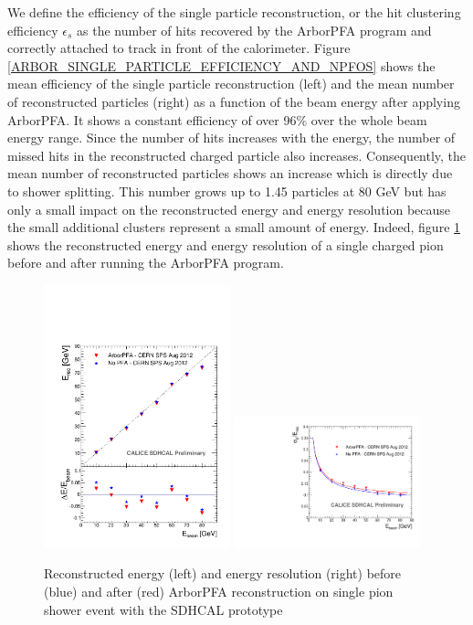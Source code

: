 \documentclass[cits]{JINST}
\begin{document}
We define the efficiency of the single particle reconstruction, or the hit clustering efficiency $\epsilon_s$ as the number of hits recovered by the ArborPFA program and correctly attached to track in front of the calorimeter. Figure \ref{ARBOR_SINGLE_PARTICLE_EFFICIENCY_AND_NPFOS} shows the mean efficiency of the single particle reconstruction (left) and the mean number of reconstructed particles (right) as a function of the beam energy after applying ArborPFA. It shows a constant efficiency of over 96\% over the whole beam energy range. Since the number of hits increases with the energy, the number of missed hits in the reconstructed charged particle also increases. Consequently, the mean number of reconstructed particles shows an increase which is directly due to shower splitting. This number grows up to 1.45 particles at 80 GeV but has only a small impact on the reconstructed energy and energy resolution because the small additional clusters represent a small amount of energy. Indeed, figure \ref{ARBOR_SINGLE_PARTICLE_EREC_AND_ERESOL} shows the reconstructed energy and energy resolution of a single charged pion before and after running the ArborPFA program. 

\begin{figure}[!h]
  \begin{center}
    \includegraphics[width=0.48\textwidth]{plots/SingleParticle_ERec.pdf}
    \includegraphics[width=0.48\textwidth]{plots/SingleParticle_EResol.pdf} \\
  \end{center}
  \caption{\label{ARBOR_SINGLE_PARTICLE_EREC_AND_ERESOL} Reconstructed energy (left) and energy resolution (right) before (blue) and after (red) ArborPFA reconstruction on single pion shower event with the SDHCAL prototype}
\end{figure}
\end{document}
